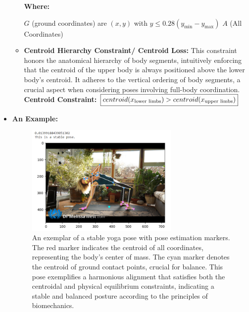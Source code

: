 \begin{itemize}
\begin{itemize}
\bigskip %

\textbf{Where:}

$G$ (ground coordinates) are $(x,y)$ with $y \leq 0.28(y_{\text{min}} - y_{\text{max}})$ \newline
$A$ (All Coordinates) 
        \item \textbf{Centroid Hierarchy Constraint/ Centroid Loss:}
        This constraint honors the anatomical hierarchy of body segments, intuitively enforcing that the centroid of the upper body is always positioned above the lower body's centroid. It adheres to the vertical ordering of body segments, a crucial aspect when considering poses involving full-body coordination.\newline \newline
        \textbf{Centroid Constraint:} $\fbox{$centroid(x_{\text{lower limbs}}) > centroid(x_{\text{upper limbs}})$}$
\newline
\end{itemize}

      \item \textbf{An Example:}
    \begin{figure}[ht]
  \centering

  \includegraphics[width=0.7\textwidth]{Images/pose1.png}
  \caption{An exemplar of a stable yoga pose with pose estimation markers. The red marker indicates the centroid of all coordinates, representing the body's center of mass. The cyan marker denotes the centroid of ground contact points, crucial for balance. This pose exemplifies a harmonious alignment that satisfies both the centroidal and physical equilibrium constraints, indicating a stable and balanced posture according to the principles of biomechanics.}
  \label{fig:pose-stability}
\end{figure}

\end{itemize}
